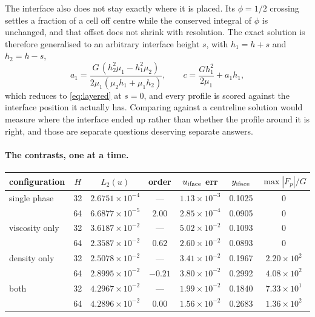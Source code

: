 \documentclass[11pt,a4paper]{article}
\newcommand{\e}[1]{\times 10^{#1}}
\begin{document}
The interface also does not stay exactly where it is placed. Its $\phi=1/2$
crossing settles a fraction of a cell off centre while the conserved integral of
$\phi$ is unchanged, and that offset does not shrink with resolution. The exact
solution is therefore generalised to an arbitrary interface height $s$, with
$h_1 = h+s$ and $h_2 = h-s$,
\begin{equation}
  a_1 = \frac{G\,(h_2^2\mu_1 - h_1^2\mu_2)}{2\mu_1(\mu_2 h_1 + \mu_1 h_2)},
  \qquad
  c = \frac{G h_1^2}{2\mu_1} + a_1 h_1,
\end{equation}
which reduces to \eqref{eq:layered} at $s=0$, and every profile is scored against
the interface position it actually has. Comparing against a centreline solution
would measure where the interface ended up rather than whether the profile around
it is right, and those are separate questions deserving separate answers.

\paragraph{The contrasts, one at a time.}

\begin{center}\small
\begin{tabular}{lcccccc}
\toprule
configuration & $H$ & $L_2(u)$ & order & $u_{\rm iface}$ err & $y_{\rm iface}$ & $\max|F_p|/G$ \\
\midrule
single phase   & 32 & $2.6751\e{-4}$ & ---     & $1.13\e{-3}$ & 0.1025 & 0 \\
               & 64 & $6.6877\e{-5}$ & $2.00$  & $2.85\e{-4}$ & 0.0905 & 0 \\
viscosity only & 32 & $3.6187\e{-2}$ & ---     & $5.02\e{-2}$ & 0.1093 & 0 \\
               & 64 & $2.3587\e{-2}$ & $0.62$  & $2.60\e{-2}$ & 0.0893 & 0 \\
density only   & 32 & $2.5078\e{-2}$ & ---     & $3.41\e{-2}$ & 0.1967 & $2.20\e{2}$ \\
               & 64 & $2.8995\e{-2}$ & $-0.21$ & $3.80\e{-2}$ & 0.2992 & $4.08\e{2}$ \\
both           & 32 & $4.2967\e{-2}$ & ---     & $1.99\e{-2}$ & 0.1840 & $7.33\e{1}$ \\
               & 64 & $4.2896\e{-2}$ & $0.00$  & $1.56\e{-2}$ & 0.2683 & $1.36\e{2}$ \\
\bottomrule
\end{tabular}
\end{center}
\end{document}
